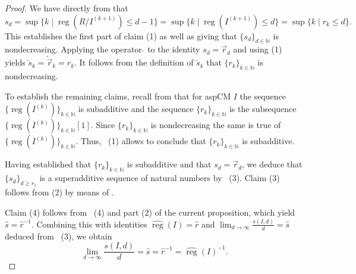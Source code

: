 \documentclass[12pt, reqno]{amsart}
\numberwithin{equation}{section}
\newcommand{\N}{{\mathbb N}}
\DeclareMathOperator{\reg}{reg}
\theoremstyle{plain} %
\theoremstyle{definition}
\theoremstyle{remark}
\begin{document}
\begin{proof}

We have directly from  that
\[
s_d=\sup\{ k\mid \reg(R/I^{(k+1)})\leq d-1\}=\sup\{ k\mid \reg (I^{(k+1)})\leq d\}=\sup\{k \mid r_k\leq d\}.
\]
This establishes  the first part of claim (1) as well as giving that $\{s_d\}_{d\in\N}$ is nondecreasing. Applying the operator $\overleftarrow{}$ to the identity  $s_d=\overrightarrow{r}_d$ and using  (1) yields $\overleftarrow{s}_k=\overleftarrow{\overrightarrow{r}}_k=r_k$. It follows from the definition of $\overleftarrow{s}_k$ that $\{r_k\}_{k\in\N}$ is nondecreasing.

To establish the remaining claims, recall from  that for aspCM $I$ the sequence $\{\reg(I^{(k)})\}_{k\in\N}$ is subadditive and the sequence $\{r_k\}_{k\in\N}$ is the subsequence $\{\reg(I^{(k)})\}_{k\in\N}[1]$. Since $\{r_k\}_{k\in\N}$ is nondecreasing the same is true of $\{\reg(I^{(k)})\}_{k\in\N}$. Thus, ~(1) allows to conclude that $\{r_k\}_{k\in\N}$ is subadditive.


Having established that $\{r_k\}_{k\in\N}$ is subadditive and that $s_d=\overrightarrow{r}_d$, we deduce that $\{s_d\}_{d\geq r_1}$ is a superadditive sequence of natural  numbers by ~(3). Claim (3) follows from (2) by means of . 

Claim (4) follows from ~(4) and  part (2) of the current proposition, which yield $\widehat{s}=\widehat{r}^{-1}$. Combining this with identities $\widehat{\reg}(I)=\widehat{r}$ and $\lim_{d\to\infty}\frac{s(I,d)}{d}=\widehat{s}$ deduced from ~(3), we obtain
\[
\lim_{d\to\infty}\frac{s(I,d)}{d}=\widehat{s}=\widehat{r}^{-1}=\widehat{\reg}(I)^{-1}.
\]
\end{proof}
\end{document}
